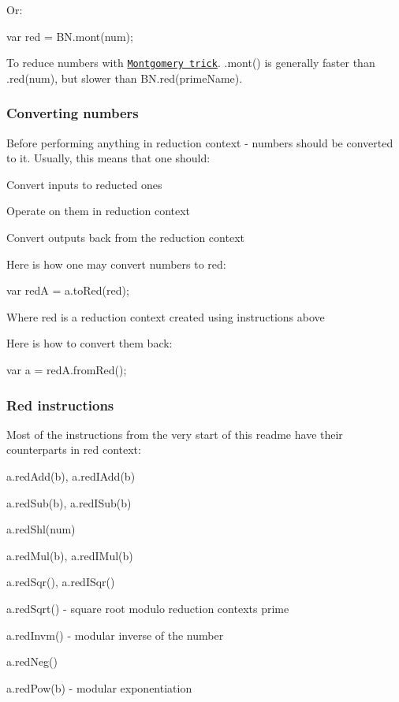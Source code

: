 Or\+:


\begin{DoxyCode}
var red = BN.mont(num);
\end{DoxyCode}


To reduce numbers with \href{https://en.wikipedia.org/wiki/Mersenne_prime}{\tt Montgomery trick}. {\ttfamily .mont()} is generally faster than {\ttfamily .red(num)}, but slower than {\ttfamily B\+N.\+red(prime\+Name)}.

\subsubsection*{Converting numbers}

Before performing anything in reduction context -\/ numbers should be converted to it. Usually, this means that one should\+:


\begin{DoxyItemize}
\item Convert inputs to reducted ones
\item Operate on them in reduction context
\item Convert outputs back from the reduction context
\end{DoxyItemize}

Here is how one may convert numbers to {\ttfamily red}\+:


\begin{DoxyCode}
var redA = a.toRed(red);
\end{DoxyCode}
 Where {\ttfamily red} is a reduction context created using instructions above

Here is how to convert them back\+:


\begin{DoxyCode}
var a = redA.fromRed();
\end{DoxyCode}


\subsubsection*{Red instructions}

Most of the instructions from the very start of this readme have their counterparts in red context\+:


\begin{DoxyItemize}
\item {\ttfamily a.\+red\+Add(b)}, {\ttfamily a.\+red\+I\+Add(b)}
\item {\ttfamily a.\+red\+Sub(b)}, {\ttfamily a.\+red\+I\+Sub(b)}
\item {\ttfamily a.\+red\+Shl(num)}
\item {\ttfamily a.\+red\+Mul(b)}, {\ttfamily a.\+red\+I\+Mul(b)}
\item {\ttfamily a.\+red\+Sqr()}, {\ttfamily a.\+red\+I\+Sqr()}
\item {\ttfamily a.\+red\+Sqrt()} -\/ square root modulo reduction context\textquotesingle{}s prime
\item {\ttfamily a.\+red\+Invm()} -\/ modular inverse of the number
\item {\ttfamily a.\+red\+Neg()}
\item {\ttfamily a.\+red\+Pow(b)} -\/ modular exponentiation
\end{DoxyItemize}

